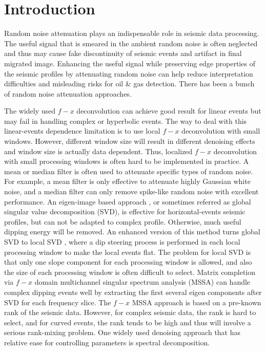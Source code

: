\section{Introduction}
Random noise attenuation plays an indispensable role in seismic data processing. The useful signal that is smeared in the ambient random noise is often neglected and thus may cause fake discontinuity of seismic events and artifact in final migrated image. Enhancing the useful signal while preserving edge properties of the seismic profiles by attenuating random noise can help reduce interpretation difficulties and misleading risks for oil \& gas detection. There has been a bunch of random noise attenuation approaches. 

The widely used $f-x$ deconvolution \cite[]{canales} can achieve good result for linear events but may fail in handling complex or hyperbolic events. The way to deal with this linear-events dependence limitation is to use local $f-x$ deconvolution with small windows. However, different window size will result in different denoising effects and  window size is actually data dependent. Thus, localized $f-x$ deconvolution with small processing windows is often hard to be implemented in practice.  A mean or median filter \cite[]{nlm,liuyang2009tvmf,yangkang2014svmf} is often used to attenuate specific types of random noise. For example, a mean filter is only effective to attenuate highly Gaussian white noise, and a median filter \cite[]{yangkang2014svmf,yangkang2014nmo} can only remove spike-like random noise with excellent performance. An eigen-image based approach \cite[]{bekara2007}, or sometimes referred as global singular value decomposition (SVD), is effective for horizontal-events seismic profiles, but can not be adapted to complex profile. Otherwise, much useful dipping energy will be removed. An enhanced version of this method turns global SVD to local SVD \cite[]{bekara2007}, where a dip steering process is performed in each local processing window to make the local events flat. The problem for local SVD is that only one slope component for each processing window is allowed, and also the size of each processing window is often difficult to select. Matrix completion via $f-x$ domain multichannel singular spectrum analysis (MSSA) can handle complex dipping events well by extracting the first several eigen components after SVD for each frequency slice. The $f-x$ MSSA approach is based on a pre-known rank of the seismic data. However, for complex seismic data, the rank is hard to select, and for curved events, the rank tends to be high and thus will involve a serious rank-mixing problem. One widely used denoising approach that has relative ease for controlling parameters is spectral decomposition. 

